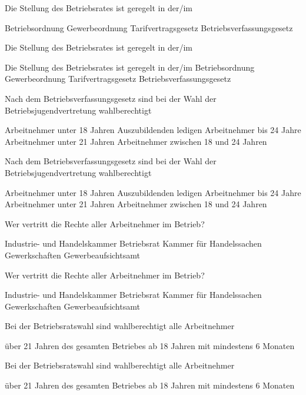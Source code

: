 \documentclass{exam}
\begin{document}
\begin{center}
\begin{questions}
		\question Die Stellung des Betriebsrates ist geregelt  in der/im
		\begin{checkboxes}
			\choice 
			\choice Betriebsordnung 
			\choice Gewerbeordnung
			\choice Tarifvertragsgesetz
			\choice Betriebsverfassungsgesetz
		\end{checkboxes}
		\newpage
		\printanswers 
		Die Stellung des Betriebsrates ist geregelt  in der/im
		\begin{checkboxes}
			\choice Die Stellung des Betriebsrates ist geregelt  in der/im
			\choice Betriebsordnung 
			\choice Gewerbeordnung
			\choice Tarifvertragsgesetz
			\CorrectChoice Betriebsverfassungsgesetz
		\end{checkboxes}
		
		\question Nach dem Betriebsverfassungsgesetz sind bei der Wahl der Betriebsjugendvertretung wahlberechtigt 
		\begin{checkboxes}
			\choice Arbeitnehmer unter 18 Jahren 
			\choice Auszubildenden
			\choice ledigen Arbeitnehmer bis 24 Jahre
			\choice Arbeitnehmer unter 21 Jahren
			\choice Arbeitnehmer zwischen 18 und 24 Jahren
		\end{checkboxes}
		\newpage
		\printanswers
		Nach dem Betriebsverfassungsgesetz sind bei der Wahl der Betriebsjugendvertretung wahlberechtigt 
		\begin{checkboxes}
			\CorrectChoice Arbeitnehmer unter 18 Jahren 
			\choice Auszubildenden
			\choice ledigen Arbeitnehmer bis 24 Jahre
			\choice Arbeitnehmer unter 21 Jahren
			\choice Arbeitnehmer zwischen 18 und 24 Jahren
		\end{checkboxes}
	
		\question Wer vertritt die Rechte aller Arbeitnehmer im Betrieb?
		\begin{checkboxes}
			\choice Industrie- und Handelskammer
			\choice Betriebsrat
			\choice Kammer für Handelssachen
			\choice Gewerkschaften
			\choice Gewerbeaufsichtsamt
		\end{checkboxes}
		\newpage
		\printanswers
		Wer vertritt die Rechte aller Arbeitnehmer im Betrieb?
		\begin{checkboxes}
			\choice Industrie- und Handelskammer
			\CorrectChoice Betriebsrat
			\choice Kammer für Handelssachen
			\choice Gewerkschaften
			\choice Gewerbeaufsichtsamt
		\end{checkboxes}
		
		\question  Bei der Betriebsratswahl sind wahlberechtigt alle Arbeitnehmer
		\begin{checkboxes}
			\choice über 21 Jahren
			\choice des gesamten Betriebes
			\choice ab 18 Jahren
			\choice mit mindestens 6 Monaten 
		\end{checkboxes}
		\newpage
		\printanswers
		Bei der Betriebsratswahl sind wahlberechtigt alle Arbeitnehmer
		\begin{checkboxes}
			\choice über 21 Jahren
			\choice des gesamten Betriebes
			\CorrectChoice ab 18 Jahren
			\choice mit mindestens 6 Monaten 
		\end{checkboxes}
	

\end{questions}
\end{center}
\end{document}
